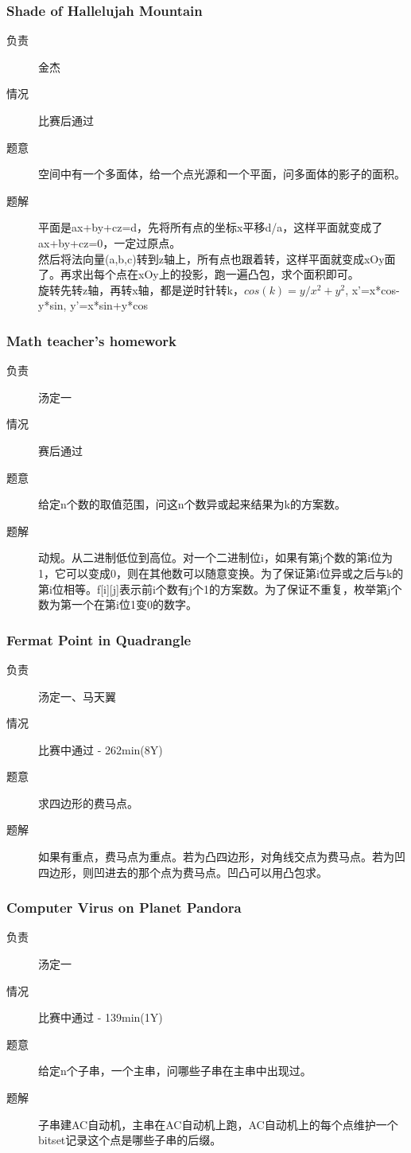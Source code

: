 \documentclass[a4paper, 11pt, nofonts, nocap, fancyhdr]{ctexart}
\newcommand{\problem}[1]{\subsubsection{#1}}
\begin{document}
\problem{Shade of Hallelujah Mountain}

\begin{description}
\item[负责] 金杰
\item[情况] 比赛后通过
\item[题意]
空间中有一个多面体，给一个点光源和一个平面，问多面体的影子的面积。
\item[题解]
平面是ax+by+cz=d，先将所有点的坐标x平移d/a，这样平面就变成了ax+by+cz=0，一定过原点。\\
然后将法向量(a,b,c)转到z轴上，所有点也跟着转，这样平面就变成xOy面了。再求出每个点在xOy上的投影，跑一遍凸包，求个面积即可。\\
旋转先转z轴，再转x轴，都是逆时针转k，$cos(k)=y/{x^2+y^2}$, x'=x*cos-y*sin, y'=x*sin+y*cos
\end{description}

\problem{Math teacher's homework}

\begin{description}
\item[负责] 汤定一
\item[情况] 赛后通过
\item[题意]
给定n个数的取值范围，问这n个数异或起来结果为k的方案数。
\item[题解]
动规。从二进制低位到高位。对一个二进制位i，如果有第j个数的第i位为1，它可以变成0，则在其他数可以随意变换。为了保证第i位异或之后与k的第i位相等。f[i][j]表示前i个数有j个1的方案数。为了保证不重复，枚举第j个数为第一个在第i位1变0的数字。
\end{description}

\problem{Fermat Point in Quadrangle}

\begin{description}
\item[负责] 汤定一、马天翼
\item[情况] 比赛中通过 - 262min(8Y)
\item[题意]
求四边形的费马点。
\item[题解]
如果有重点，费马点为重点。若为凸四边形，对角线交点为费马点。若为凹四边形，则凹进去的那个点为费马点。凹凸可以用凸包求。
\end{description}

\problem{Computer Virus on Planet Pandora}

\begin{description}
\item[负责] 汤定一
\item[情况] 比赛中通过 - 139min(1Y)
\item[题意]
给定n个子串，一个主串，问哪些子串在主串中出现过。
\item[题解]
子串建AC自动机，主串在AC自动机上跑，AC自动机上的每个点维护一个bitset记录这个点是哪些子串的后缀。
\end{description}
\end{document}
